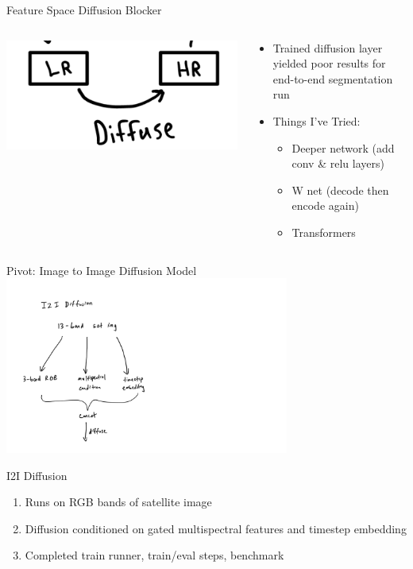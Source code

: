 \begin{frame}{Feature Space Diffusion Blocker}
  \begin{columns}[c]
    \begin{column}{0.48\textwidth}
      \centering
      \includegraphics[width=\linewidth]{images/ls-diffuse.png}
    \end{column}
    \begin{column}{0.48\textwidth}
      \begin{itemize}
        \item Trained diffusion layer yielded poor results for end-to-end segmentation run
        \item Things I've Tried:
        \begin{itemize}
          \item Deeper network (add conv & relu layers)
          \item W net (decode then encode again)
          \item Transformers
        \end{itemize}
      \end{itemize}
    \end{column}
  \end{columns}
\end{frame}

\begin{frame}{Pivot: Image to Image Diffusion Model}
    \centering
    \includegraphics[height=0.7\textheight,width=0.7\textwidth,keepaspectratio]{images/i2i-diffuse.png}
\end{frame}

\begin{frame}{I2I Diffusion}
    \begin{enumerate}
        \item Runs on RGB bands of satellite image
        \item Diffusion conditioned on gated multispectral features and timestep embedding
        \item Completed train runner, train/eval steps, benchmark
    \end{enumerate}
\end{frame}
